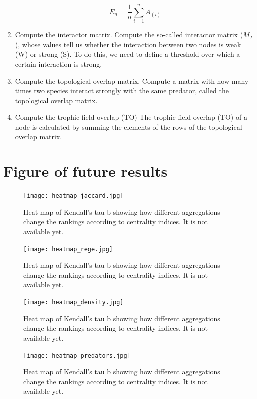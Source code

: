 \documentclass[twocolumn]{article}
\begin{document}
\begin{appendices}
\begin{enumerate}
					\begin{equation}
						E_n=\frac{1}{n}\sum_{i=1}^{n}A_{\left(i\right)}
					\end{equation}

			\item Compute the interactor matrix.
					Compute the so-called interactor matrix ($M_T$), whose values tell us whether the interaction between two nodes is weak (W) or strong (S).
					To do this, we need to define a threshold over which a certain interaction is strong.
		  \item Compute the topological overlap matrix.
					Compute a matrix with how many times two species interact strongly with the same predator, called the topological overlap matrix.
		  \item Compute the trophic field overlap (TO)
					The trophic field overlap (TO) of a node is calculated by summing the elements of the rows of the topological overlap matrix.
		\end{enumerate}

	\section{Figure of future results}

		\begin{figure}[b]%
			\centering
			\texttt{[image: heatmap\_jaccard.jpg]}
			\caption{Heat map of Kendall's tau b showing how different aggregations change the rankings according to centrality indices. It is not available yet. } \label{fig:jaccard_results}
		\end{figure}

		\begin{figure}[b]%
			\centering
			\texttt{[image: heatmap\_rege.jpg]}
			\caption{Heat map of Kendall's tau b showing how different aggregations change the rankings according to centrality indices. It is not available yet. } \label{fig:rege_results}
		\end{figure}

		\begin{figure}[b]%
			\centering
			\texttt{[image: heatmap\_density.jpg]}
			\caption{Heat map of Kendall's tau b showing how different aggregations change the rankings according to centrality indices. It is not available yet. } \label{fig:density_results}
		\end{figure}

		\begin{figure}[b]%
			\centering
			\texttt{[image: heatmap\_predators.jpg]}
			\caption{Heat map of Kendall's tau b showing how different aggregations change the rankings according to centrality indices. It is not available yet. } \label{fig:predators_results}
		\end{figure}


\end{appendices}
\end{document}
